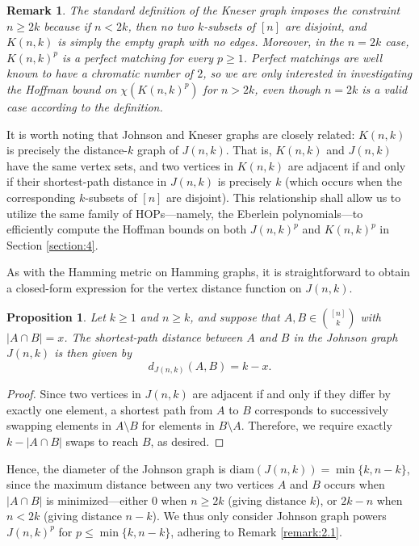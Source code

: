 \documentclass{article}
\numberwithin{equation}{section}
\theoremstyle{plain}
\newtheorem{proposition}[theorem]{Proposition}
\newtheorem{remark}[theorem]{Remark}
\begin{document}
\begin{remark}\label{remark:2.2}
    The standard definition of the Kneser graph imposes the constraint $n \ge 2k$ because if $n < 2k$, then no two $k$-subsets of $[n]$ are disjoint, and $K(n, k)$ is simply the empty graph with no edges. Moreover, in the $n = 2k$ case, $K(n, k)^p$ is a perfect matching for every $p \ge 1$. Perfect matchings are well known to have a chromatic number of $2$, so we are only interested in investigating the Hoffman bound on $\chi(K(n, k)^p)$ for $n > 2k$, even though $n = 2k$ is a valid case according to the definition.
\end{remark}

It is worth noting that Johnson and Kneser graphs are closely related: $K(n, k)$ is precisely the distance-$k$ graph of $J(n, k)$. That is, $K(n, k)$ and $J(n, k)$ have the same vertex sets, and two vertices in $K(n, k)$ are adjacent if and only if their shortest-path distance in $J(n, k)$ is precisely $k$ (which occurs when the corresponding $k$-subsets of $[n]$ are disjoint). This relationship shall allow us to utilize the same family of HOPs---namely, the Eberlein polynomials---to efficiently compute the Hoffman bounds on both $J(n, k)^p$ and $K(n, k)^p$ in Section \ref{section:4}.

As with the Hamming metric on Hamming graphs, it is straightforward to obtain a closed-form expression for the vertex distance function on $J(n, k)$.

\begin{proposition}\label{prop:2.3}
    Let $k \ge 1$ and $n \ge k$, and suppose that $A, B \in \binom{[n]}{k}$ with $\lvert A \cap B \rvert = x$. The shortest-path distance between $A$ and $B$ in the Johnson graph $J(n, k)$ is then given by
    \[d_{J(n, k)}(A, B) = k - x.\]
\end{proposition}

\begin{proof}
    Since two vertices in $J(n, k)$ are adjacent if and only if they differ by exactly one element, a shortest path from $A$ to $B$ corresponds to successively swapping elements in $A \setminus B$ for elements in $B \setminus A$. Therefore, we require exactly $k - \lvert A \cap B \rvert$ swaps to reach $B$, as desired.
\end{proof}

Hence, the diameter of the Johnson graph is $\mathrm{diam}(J(n, k)) = \min\{k, n - k\}$, since the maximum distance between any two vertices $A$ and $B$ occurs when $\lvert A \cap B \rvert$ is minimized---either $0$ when $n \ge 2k$ (giving distance $k$), or $2k - n$ when $n < 2k$ (giving distance $n - k$). We thus only consider Johnson graph powers $J(n, k)^p$ for $p \le \min\{k, n - k\}$, adhering to Remark \ref{remark:2.1}.
\end{document}
